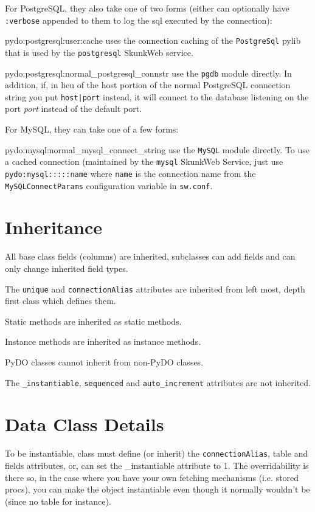 \documentclass[titlepage]{manual}
\begin{document}
For PostgreSQL, they also take one of two forms (either can optionally
have \texttt{:verbose} appended to them to log the sql executed by the
connection): 
\begin{argdesc}
\item[pydo:postgresql:user:cache] uses the connection caching of the
\texttt{PostgreSql} pylib that is used by the \texttt{postgresql}
SkunkWeb service.
\item[pydo:postgresql:normal\_postgresql\_connstr] use the
\texttt{pgdb} module directly.  In addition, if, in lieu of the host
portion of the normal PostgreSQL connection string you put
\texttt{host|port} instead, it will connect to the database listening
on the port \emph{port} instead of the default port.
\end{argdesc}

For MySQL, they can take one of a few forms:
\begin{argdesc}
\item[pydo:mysql:normal\_mysql\_connect\_string] use the
\texttt{MySQL} module directly.  To use a cached connection
(maintained by the \texttt{mysql} SkunkWeb Service, just use
\texttt{pydo:mysql:::::name} where \texttt{name} is the connection
name from the \texttt{MySQLConnectParams} configuration variable in
\texttt{sw.conf}.
\end{argdesc}


\section{Inheritance}
All base class fields (columns) are inherited, subclasses can add fields 
and can only change inherited field types.

The \texttt{unique} and \texttt{connectionAlias} attributes are
inherited from left most, depth first class which defines them.

Static methods are inherited as static methods.

Instance methods are inherited as instance methods.

PyDO classes cannot inherit from non-PyDO classes.

The \texttt{_instantiable}, \texttt{sequenced} and
\texttt{auto_increment} attributes are not inherited.



\section{Data Class Details}
To be instantiable, class must define (or inherit) the
\texttt{connectionAlias}, table and fields attributes, or, can set the
_instantiable attribute to 1.  The overridability is there so, in the
case where you have your own fetching mechanisms (i.e. stored procs),
you can make the object instantiable even though it normally wouldn't
be (since no table for instance).
\end{document}
